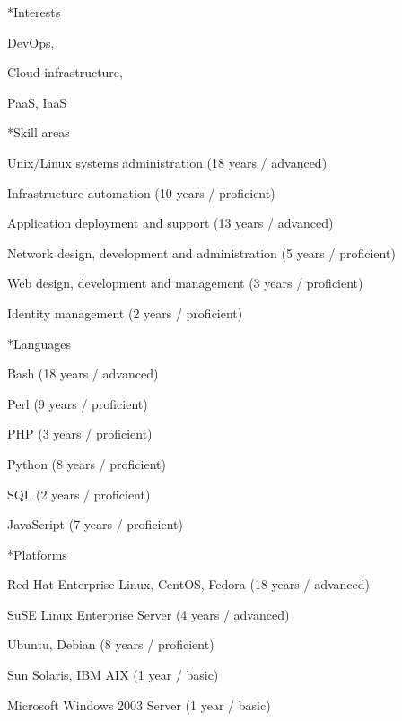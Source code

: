 \documentclass[10pt, a4paper, final]{article}
\begin{document}
\begin{minipage}[t]{0.32\linewidth}
\begin{section}
    \vspace{2em}
    \small
    \begin{subsection}*{Interests}
      \begin{inparadesc}
        \item DevOps,
        \item Cloud infrastructure,
        \item PaaS, IaaS
      \end{inparadesc}
    \end{subsection}
    \vspace{1em}
    \begin{subsection}*{Skill areas}
      \begin{compactitem}
        \item Unix/Linux systems administration (18 years / advanced) 
        \item Infrastructure automation (10 years / proficient) 
        \item Application deployment and support (13 years / advanced) 
        \item Network design, development and administration (5 years / proficient) 
        \item Web design, development and management (3 years / proficient) 
        \item Identity management (2 years / proficient) 
      \end{compactitem}
    \end{subsection}
    \vspace{1em}
    \begin{subsection}*{Languages}
      \begin{compactitem}
        \item Bash (18 years / advanced) 
        \item Perl (9 years / proficient) 
        \item PHP (3 years / proficient) 
        \item Python (8 years / proficient) 
        \item SQL (2 years / proficient) 
        \item JavaScript (7 years / proficient) 
      \end{compactitem}
    \end{subsection}
    \vspace{1em}
    \begin{subsection}*{Platforms}
      \begin{compactitem}
        \item Red Hat Enterprise Linux, CentOS, Fedora (18 years / advanced) 
        \item SuSE Linux Enterprise Server (4 years / advanced) 
        \item Ubuntu, Debian (8 years / proficient) 
        \item Sun Solaris, IBM AIX (1 year / basic) 
        \item Microsoft Windows 2003 Server (1 year / basic) 
      \end{compactitem}
    \end{subsection}
  \end{section}
\end{minipage}
\end{document}
